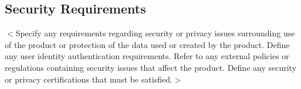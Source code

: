 \documentclass{scrreprt}
\begin{document}
\begin{CJK}{UTF8}{bkai}
\section{Security Requirements}
$<$Specify any requirements regarding security or privacy issues surrounding use 
of the product or protection of the data used or created by the product. Define 
any user identity authentication requirements. Refer to any external policies or 
regulations containing security issues that affect the product. Define any 
security or privacy certifications that must be satisfied.$>$


\end{CJK}
\end{document}

